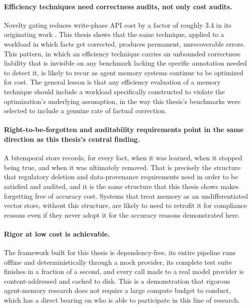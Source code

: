 \paragraph{Efficiency techniques need correctness audits, not only cost audits.} Novelty gating reduces write-phase API cost by a factor of roughly 3.4 in its originating work \citep{wang2026sage}. This thesis shows that the same technique, applied to a workload in which facts get corrected, produces permanent, unrecoverable errors. This pattern, in which an efficiency technique carries an unbounded correctness liability that is invisible on any benchmark lacking the specific annotation needed to detect it, is likely to recur as agent memory systems continue to be optimized for cost. The general lesson is that any efficiency evaluation of a memory technique should include a workload specifically constructed to violate the optimization's underlying assumption, in the way this thesis's benchmarks were selected to include a genuine rate of factual correction.

\paragraph{Right-to-be-forgotten and auditability requirements point in the same direction as this thesis's central finding.} A bitemporal store records, for every fact, when it was learned, when it stopped being true, and when it was ultimately removed. That is precisely the structure that regulatory deletion and data-provenance requirements need in order to be satisfied and audited, and it is the same structure that this thesis shows makes forgetting free of accuracy cost. Systems that treat memory as an undifferentiated vector store, without this structure, are likely to need to retrofit it for compliance reasons even if they never adopt it for the accuracy reasons demonstrated here.

\paragraph{Rigor at low cost is achievable.} The framework built for this thesis is dependency-free, its entire pipeline runs offline and deterministically through a mock provider, its complete test suite finishes in a fraction of a second, and every call made to a real model provider is content-addressed and cached to disk. This is a demonstration that rigorous agent-memory research does not require a large compute budget to conduct, which has a direct bearing on who is able to participate in this line of research.

